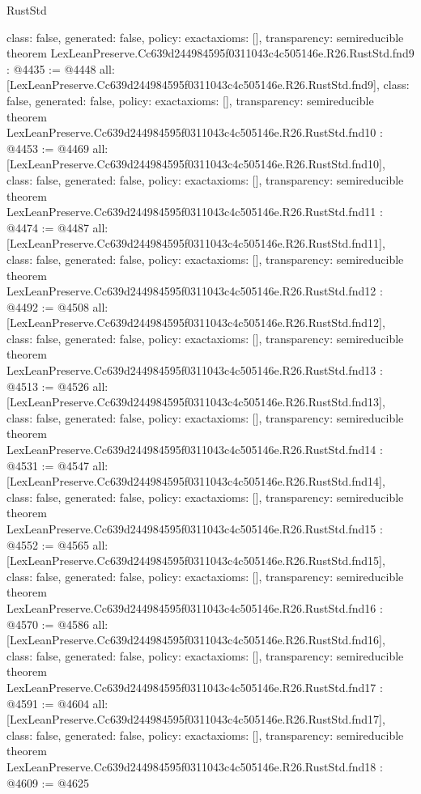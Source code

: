 \begin{lexlean}{RustStd}
\begin{coremodule}
{  class: false,
  generated: false,
  policy: exact{axioms: []},
  transparency: semireducible
}
theorem LexLeanPreserve.Cc639d244984595f0311043c4c505146e.R26.RustStd.fnd9 : @4435 := @4448 {
  all: [LexLeanPreserve.Cc639d244984595f0311043c4c505146e.R26.RustStd.fnd9],
  class: false,
  generated: false,
  policy: exact{axioms: []},
  transparency: semireducible
}
theorem LexLeanPreserve.Cc639d244984595f0311043c4c505146e.R26.RustStd.fnd10 : @4453 := @4469 {
  all: [LexLeanPreserve.Cc639d244984595f0311043c4c505146e.R26.RustStd.fnd10],
  class: false,
  generated: false,
  policy: exact{axioms: []},
  transparency: semireducible
}
theorem LexLeanPreserve.Cc639d244984595f0311043c4c505146e.R26.RustStd.fnd11 : @4474 := @4487 {
  all: [LexLeanPreserve.Cc639d244984595f0311043c4c505146e.R26.RustStd.fnd11],
  class: false,
  generated: false,
  policy: exact{axioms: []},
  transparency: semireducible
}
theorem LexLeanPreserve.Cc639d244984595f0311043c4c505146e.R26.RustStd.fnd12 : @4492 := @4508 {
  all: [LexLeanPreserve.Cc639d244984595f0311043c4c505146e.R26.RustStd.fnd12],
  class: false,
  generated: false,
  policy: exact{axioms: []},
  transparency: semireducible
}
theorem LexLeanPreserve.Cc639d244984595f0311043c4c505146e.R26.RustStd.fnd13 : @4513 := @4526 {
  all: [LexLeanPreserve.Cc639d244984595f0311043c4c505146e.R26.RustStd.fnd13],
  class: false,
  generated: false,
  policy: exact{axioms: []},
  transparency: semireducible
}
theorem LexLeanPreserve.Cc639d244984595f0311043c4c505146e.R26.RustStd.fnd14 : @4531 := @4547 {
  all: [LexLeanPreserve.Cc639d244984595f0311043c4c505146e.R26.RustStd.fnd14],
  class: false,
  generated: false,
  policy: exact{axioms: []},
  transparency: semireducible
}
theorem LexLeanPreserve.Cc639d244984595f0311043c4c505146e.R26.RustStd.fnd15 : @4552 := @4565 {
  all: [LexLeanPreserve.Cc639d244984595f0311043c4c505146e.R26.RustStd.fnd15],
  class: false,
  generated: false,
  policy: exact{axioms: []},
  transparency: semireducible
}
theorem LexLeanPreserve.Cc639d244984595f0311043c4c505146e.R26.RustStd.fnd16 : @4570 := @4586 {
  all: [LexLeanPreserve.Cc639d244984595f0311043c4c505146e.R26.RustStd.fnd16],
  class: false,
  generated: false,
  policy: exact{axioms: []},
  transparency: semireducible
}
theorem LexLeanPreserve.Cc639d244984595f0311043c4c505146e.R26.RustStd.fnd17 : @4591 := @4604 {
  all: [LexLeanPreserve.Cc639d244984595f0311043c4c505146e.R26.RustStd.fnd17],
  class: false,
  generated: false,
  policy: exact{axioms: []},
  transparency: semireducible
}
theorem LexLeanPreserve.Cc639d244984595f0311043c4c505146e.R26.RustStd.fnd18 : @4609 := @4625 {
}
\end{coremodule}
\end{lexlean}
